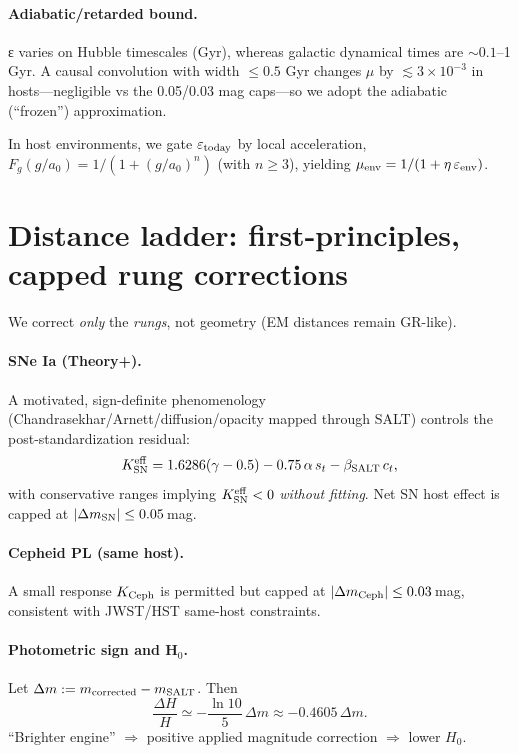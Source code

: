 \documentclass[aps,prd,preprint,onecolumn,longbibliography,nofootinbib]{revtex4-2}
\theoremstyle{plain}
\theoremstyle{remark}
\newcommand{\Hzero}{H_0}
\newcommand{\beS}{\beta_{\rm SALT}}
\newcommand{\eps}{\varepsilon}
\begin{document}
\paragraph*{Adiabatic/retarded bound.} ε varies on Hubble timescales (Gyr), whereas galactic dynamical times are $\sim 0.1$–1 Gyr. A causal convolution with width $\le 0.5$ Gyr changes $\mu$ by $\lesssim 3\times 10^{-3}$ in hosts—negligible vs the 0.05/0.03 mag caps—so we adopt the adiabatic (“frozen”) approximation.

In host environments, we gate $\eps_{\rm today}$ by local acceleration, $F_g(g/a_0)=1/(1+(g/a_0)^n)$ (with $n\!\ge\!3$), yielding $\mu_{\rm env}=1/(1+\eta\,\eps_{\rm env})$.

\section{Distance ladder: first-principles, capped rung corrections}\label{sec:ladder}
We correct \emph{only} the \emph{rungs}, not geometry (EM distances remain GR-like).

\paragraph*{SNe Ia (Theory+).}
A motivated, sign-definite phenomenology (Chandrasekhar/Arnett/diffusion/opacity mapped through SALT) controls the post-standardization residual:
\begin{equation}
K^{\rm eff}_{\rm SN}=1.6286(\gamma-0.5)-0.75\,\alpha\,s_t-\beS\,c_t,
\end{equation}
with conservative ranges implying $K^{\rm eff}_{\rm SN}<0$ \emph{without fitting}. Net SN host effect is capped at $|\Delta m_{\rm SN}|\le 0.05$\,mag.

\paragraph*{Cepheid PL (same host).}
A small response $K_{\rm Ceph}$ is permitted but capped at $|\Delta m_{\rm Ceph}|\le 0.03$\,mag, consistent with JWST/HST same-host constraints.

\paragraph*{Photometric sign and H$_0$.}
Let $\Delta m:=m_{\rm corrected}-m_{\rm SALT}$. Then
\begin{equation}
\frac{\Delta H}{H}\simeq -\frac{\ln 10}{5}\,\Delta m \approx -0.4605\,\Delta m.
\end{equation}
“Brighter engine” $\Rightarrow$ positive applied magnitude correction $\Rightarrow$ lower $\Hzero$.
\end{document}
